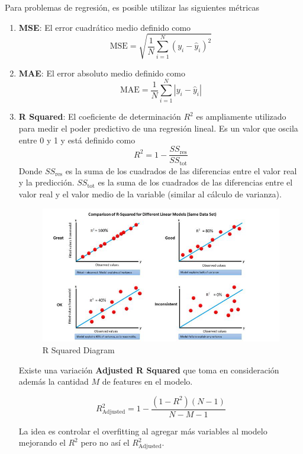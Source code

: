 Para problemas de regresión, es posible utilizar las siguientes métricas 
\begin{enumerate}
    \item \textbf{MSE}: El error cuadrático medio definido como 
    $$ 
    \text{MSE} = \sqrt{\frac{1}{N}\sum_{i=1}^N(y_i - \hat{y}_i)^2}
    $$
    \item \textbf{MAE}: El error absoluto medio definido como 
    $$ 
    \text{MAE} = \frac{1}{N}\sum_{i=1}^N|y_i - \hat{y}_i|
    $$
    \item \textbf{R Squared}: El coeficiente de determinación $R^2$ es ampliamente utilizado para medir el poder predictivo de una regresión lineal. Es un valor que oscila entre 0 y 1 y está definido como 
    $$ 
    R^2 = 1 - \frac{SS_{\text{res}}}{SS_{\text{tot}}}
    $$
    Donde $SS_{\text{res}}$ es la suma de los cuadrados de las diferencias entre el valor real y la predicción. $SS_{\text{tot}}$ es la suma de los cuadrados de las diferencias entre el valor real y el valor medio de la variable (similar al cálculo de varianza). 

    \begin{figure}[H]
    \center
    \includegraphics[scale=0.1]{notebooks/Others/img/r_squared_diagram.png}
    \caption{R Squared Diagram}
    \end{figure}

    Existe una variación \textbf{Adjusted R Squared} que toma en consideración además la cantidad $M$ de features en el modelo. 

    $$
    R^2_{\text{Adjusted}} = 1 - \frac{(1-R^2)(N-1)}{N-M-1}
    $$

    La idea es controlar el overfitting al agregar más variables al modelo mejorando el $R^2$ pero no así el $R^2_{\text{Adjusted}}$.
    
\end{enumerate}

